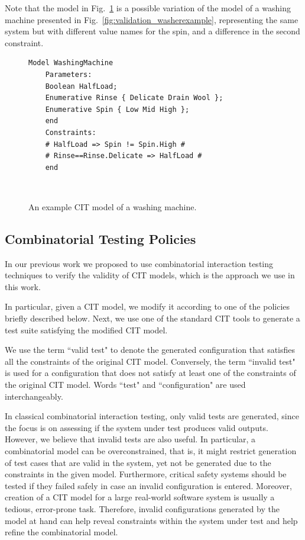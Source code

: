 \begin{tikzborder}{\cite{Gargantini16:validation}}
\begin{tikzborder}{\cite{gargantini_combinatorial_2017}}
Note that the \citlab{} model in Fig.~\ref{fig:washerexample} is a possible variation of the \citlab{} model of a washing machine presented in Fig.~\ref{fig:validation_washerexample}, representing the same system but with different value names for the spin, and a difference in the second constraint.

\begin{figure}[h]
	\centering 
	\begin{lstlisting}[language=comb]
	Model WashingMachine
	Parameters:
	Boolean HalfLoad;
	Enumerative Rinse { Delicate Drain Wool };
	Enumerative Spin { Low Mid High };
	end
	Constraints:
	# HalfLoad => Spin != Spin.High #
	# Rinse==Rinse.Delicate => HalfLoad #
	end\end{lstlisting}
	\protect\caption{An example CIT model of a washing machine.}\
	\label{fig:washerexample} 
\end{figure}


\subsection{Combinatorial Testing Policies}
\label{sec:citpolicies}

\begin{tikzborder}{\cite{gargantini_combinatorial_2017}}
In our previous work \cite{Gargantini16:validation} we proposed to use combinatorial interaction testing techniques to verify the validity of CIT models, which is the approach we use in this work. 

In particular, given a CIT model, we modify it according to one of the policies briefly described below. 
Next, we use one of the standard CIT tools to generate a test suite satisfying the modified CIT model. %

We use the term ``valid test" to denote the generated configuration that satisfies all the constraints of the original CIT model. Conversely, the term ``invalid test" is used for a configuration that does not satisfy at least one of the constraints of the original CIT model. Words ``test" and ``configuration" are used interchangeably.

In classical combinatorial interaction testing, only valid tests are generated, since the focus is on assessing if the system under test produces valid outputs. 
However, we believe that invalid tests are also useful.  In particular, a combinatorial model can be overconstrained, that is, it might restrict generation of test cases that are valid in the system, yet not be generated due to the constraints in the given model. Furthermore, critical safety systems should be tested if they failed safely in case an invalid configuration is entered. Moreover, creation of a CIT model for a large real-world software system is usually a tedious, error-prone task. Therefore, invalid configurations generated by the model at hand can help reveal constraints within the system under test and help refine the combinatorial model.


\end{tikzborder}
\end{tikzborder}
\end{tikzborder}
